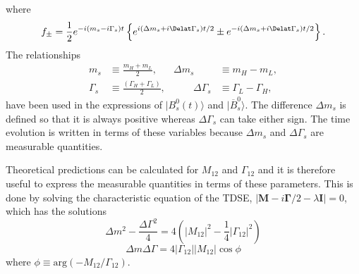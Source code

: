 {%
where 
\begin{equation}
f_{\pm} = \frac{1}{2} e^{-i(m_s - i\Gamma_s)t} \left \{ e^{i(\Delta m_s + i \Delat\Gamma_s)t/2} \pm e^{-i(\Delta m_s + i \Delat\Gamma_s)t/2} \right \}.
\end{equation}
The relationships
\begin{align}
m_s &\equiv \frac{m_H + m_L}{2}, &  \Delta m_s &\equiv m_H - m_L,\\
\Gamma_s &\equiv \frac{(\Gamma_H + \Gamma_L)}{2}, & \qquad \Delta \Gamma_s &\equiv \Gamma_L - \Gamma_H,
\label{eq:deltas}
\end{align}
have been used in the expressions of $|B^{0}_{s}(t)\rangle$ and $|\overline{B}^{0}_{s} \rangle$. The difference $\Delta m_s$ is defined so that it is always positive whereas $\Delta\Gamma_s$ can take either sign. The time evolution is written in terms of these variables because $\Delta m_s$ and $\Delta\Gamma_s$ are measurable quantities.

Theoretical predictions can be calculated for $M_{12}$ and $\Gamma_{12}$ and it is therefore useful to express the measurable quantities in terms of these parameters. This is done by solving the characteristic equation of the TDSE, $|\mathbf{M} - i \mathbf{\Gamma}/2 - \lambda \mathbf{I}| = 0$, which has the solutions
\begin{equation}
\Delta m^2 - \frac{\Delta\Gamma^2}{4} = 4(|M_{12}|^2 - \frac{1}{4} |\Gamma_{12}|^2) 
\end{equation}
\begin{equation}
\Delta m \Delta \Gamma = 4 |\Gamma_{12}| |M_{12}| \cos \phi
\end{equation}
where $\phi \equiv \mathrm{arg}(-M_{12}/\Gamma_{12})$.

}
